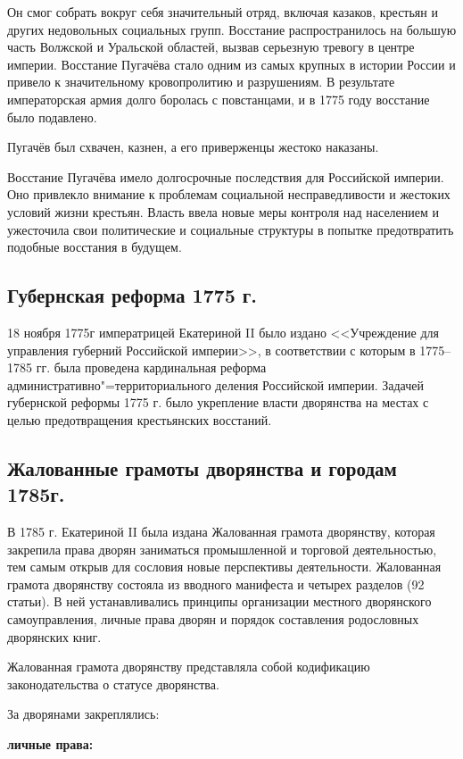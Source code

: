Он смог собрать вокруг себя значительный отряд, включая казаков, крестьян и других недовольных социальных групп. Восстание распространилось на большую часть Волжской и Уральской областей, вызвав серьезную тревогу в центре империи. Восстание Пугачёва стало одним из самых крупных в истории России и привело к значительному кровопролитию и разрушениям. В результате императорская армия долго боролась с повстанцами, и в 1775 году восстание было подавлено. 

Пугачёв был схвачен, казнен, а его приверженцы жестоко наказаны.

Восстание Пугачёва имело долгосрочные последствия для Российской империи. Оно привлекло внимание к проблемам социальной несправедливости и жестоких условий жизни крестьян. Власть ввела новые меры контроля над населением и ужесточила свои политические и социальные структуры в попытке предотвратить подобные восстания в будущем.

\subsection{Губернская реформа 1775 г.}

18 ноября 1775г императрицей Екатериной II было издано <<Учреждение для управления губерний Российской империи>>, в соответствии с которым в 1775--1785 гг. была проведена кардинальная реформа административно"=территориального деления Российской империи. Задачей губернской реформы 1775 г. было укрепление власти дворянства на местах с целью предотвращения крестьянских восстаний.

\subsection{Жалованные грамоты дворянства и городам 1785г.}

В 1785 г. Екатериной II была издана Жалованная грамота дворянству, которая закрепила права дворян заниматься промышленной и торговой деятельностью, тем самым открыв для сословия новые перспективы деятельности. Жалованная грамота дворянству состояла из вводного манифеста и четырех разделов (92 статьи). В ней устанавливались принципы организации местного дворянского самоуправления, личные права дворян и порядок составления родословных дворянских книг.

Жалованная грамота дворянству представляла собой кодификацию законодательства о статусе дворянства. 

За дворянами закреплялись:

\textbf{личные права:}

